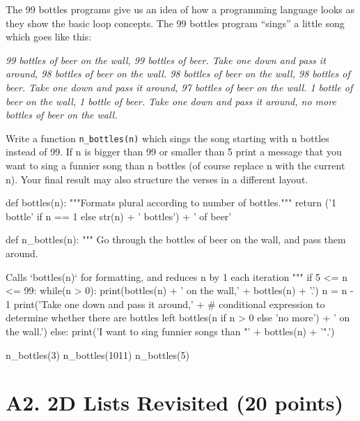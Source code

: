 The 99 bottles programs give us an idea of how a programming language looks as they show the basic loop concepts.
The 99 bottles program “sings” a little song which goes like this:

\vspace{1em}

\noindent \textit{99 bottles of beer on the wall, 99 bottles of beer.
Take one down and pass it around, 98 bottles of beer on the wall.
98 bottles of beer on the wall, 98 bottles of beer.
Take one down and pass it around, 97 bottles of beer on the wall.
1 bottle of beer on the wall, 1 bottle of beer.
Take one down and pass it around, no more bottles of beer on the wall.
}

\vspace{1em}


\noindent Write a function \texttt{n\_bottles(n)} which sings the song starting with n bottles instead of 99. If n is bigger than 99 or smaller than 5 print a message that you want to sing a funnier song than n bottles (of course replace n with the current n). Your final result may also structure the verses in a different layout.

\vspace{1em}

\begin{solution}
    \begin{pythoncode}
def bottles(n):
    """Formats plural according to number of bottles."""
    return ('1 bottle' if n == 1 else str(n) + ' bottles') + ' of beer'

def n_bottles(n):
    """
    Go through the bottles of beer on the wall, and pass them around.

    Calls `bottles(n)` for formatting, and reduces n by 1 each iteration
    """
    if 5 <= n <= 99:
        while(n > 0):
            print(bottles(n) + ' on the wall,\n  ' + bottles(n) + '.')
            n = n - 1
            print('Take one down and pass it around,\n  ' +
                # conditional expression to determine whether there are bottles left
                bottles(n if n > 0 else 'no more') +
                ' on the wall.\n')
    else:
        print('I want to sing funnier songs than "' + bottles(n) + '".\n')


n_bottles(3)
n_bottles(1011)
n_bottles(5)

    \end{pythoncode}
\end{solution}

\section*{A2. 2D Lists Revisited (20 points)}



